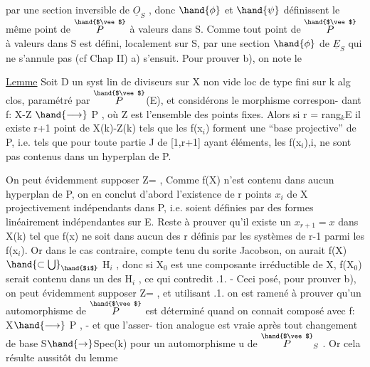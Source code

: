 
par une section inversible de $\underline{O}_S$ , donc $\hand{\phi}$ et $\hand{\psi}$ définissent le même point
de $\overset{\hand{$\vee$}}{P}$ à valeurs dans S. Comme tout point de $\overset{\hand{$\vee$}}{P}$ à valeurs dans S est défini,
localement sur S, par une section $\hand{\phi}$ de $\underline{E}_S$ qui ne s'annule pas (cf Chap II)
a) s'ensuit.   Pour prouver b), on note le

\uline{Lemme}   Soit D un syst lin de diviseurs sur X non vide loc de type fini
sur k alg clos, paramétré par $\overset{\hand{$\vee$}}{P}$(E), et considérons le morphisme correspon-%
dant  f: X-Z $\hand{\longrightarrow}$ P , où Z est l'ensemble des points fixes. Alors  si
r = rang$_k$E  il existe  r+1 point de  X(k)-Z(k)  tels que les
f(x$_i$) forment une  ``base projective'' de P, i.e. tels que  pour toute
partie J de [1,r+1] ayant   éléments,  les  f(x$_i$),i,  ne sont pas
contenus dans un hyperplan de P.

On peut évidemment supposer Z=\hand{$\emptyset$} ,   Comme  f(X) n'est contenu dans
aucun hyperplan de P, on en conclut d'abord l'existence de r points
$x_i$ de X  projectivement indépendants dans P, i.e. soient définies
par des formes linéairement indépendantes sur E.   Reste à prouver qu'il
existe un  $x_{r+1} = x$   dans X(k) tel que  f(x) ne soit dans aucun des r
  définis par les  systèmes de r-1 parmi les f(x$_i$). Or dans
le cas contraire, compte tenu du sorite Jacobson,  on aurait
f(X) $\hand{\subset\bigcup}_{\hand{$i$}}$ H$_i$ , donc  si X$_0$  est une composante
irréductible de X, f(X$_0$) serait contenu dans un des H$_i$ , ce qui contredit
.1. - Ceci posé,  pour prouver b), on peut  évidemment supposer Z=\hand{$\emptyset$} ,
et utilisant .1.  on est ramené à prouver qu'un automorphisme de $\overset{\hand{$\vee$}}{P}$ est
déterminé quand on connait  composé avec f: X$\hand{\longrightarrow}$ P , - et que l'asser-%
tion analogue est vraie après tout changement de base S$\hand{\rightarrow}$Spec(k)
pour un  automorphisme u de $\overset{\hand{$\vee$}}{P}_S$  .  Or cela résulte aussitôt  du lemme

